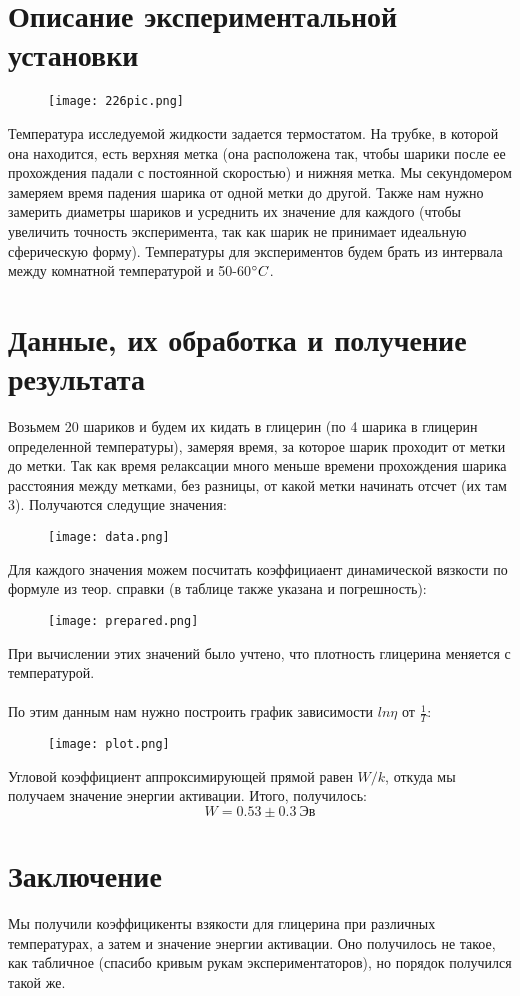 \documentclass[a4paper, 12pt]{article}
\begin{document}
\section{Описание экспериментальной установки} 
\begin{figure}[h]
    \centering
    \texttt{[image: 226pic.png]}
\end{figure}
Температура исследуемой жидкости задается термостатом. На трубке, в которой она находится, есть верхняя метка (она расположена так, чтобы шарики после ее прохождения падали с постоянной скоростью) и нижняя метка. Мы секундомером замеряем время падения шарика от одной метки до другой. Также нам нужно замерить диаметры шариков и усреднить их значение для каждого (чтобы увеличить точность эксперимента, так как шарик не принимает идеальную сферическую форму). Температуры для экспериментов будем брать из интервала между комнатной температурой и 50-60\(\degree C\).

\section{Данные, их обработка и получение результата}
Возьмем 20 шариков и будем их кидать в глицерин (по 4 шарика в глицерин определенной температуры), замеряя время, за которое шарик проходит от метки до метки. Так как время релаксации много меньше времени прохождения шарика расстояния между метками, без разницы, от какой метки начинать отсчет (их там 3). Получаются следущие значения:
\begin{figure}[h]
    \centering
    \texttt{[image: data.png]}
\end{figure}
\newpage
Для каждого значения можем посчитать коэффициаент динамической вязкости по формуле из теор. справки (в таблице также указана и погрешность):

\begin{figure}[h]
    \centering
    \texttt{[image: prepared.png]}
\end{figure}
При вычислении этих значений было учтено, что плотность глицерина меняется с температурой.
\\
\\
По этим данным нам нужно построить график зависимости \(ln \eta\) от \(\frac{1}{T}\):
\begin{figure}[h]
    \centering
    \texttt{[image: plot.png]}
\end{figure}

Угловой коэффициент аппроксимирующей прямой равен \(W/k\), откуда мы получаем значение энергии активации. Итого, получилось:
\[W = 0.53 \pm 0.3\ Эв\]
\section{Заключение}
Мы получили коэффицикенты взякости для глицерина при различных температурах, а затем и значение энергии активации. Оно получилось не такое, как табличное (спасибо кривым рукам экспериментаторов), но порядок получился такой же.
\end{document}
